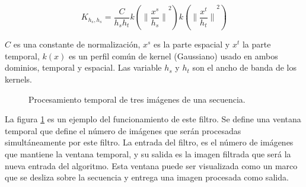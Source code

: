 \begin{equation} \label{eq:sagmm_filter}
K_{h_s,h_s} = \frac{C}{h_s h_t} k \left( {\| \frac{x^s}{h_s} \|}^2 \right) k \left( {\| \frac{x^t}{h_t} \|}^2 \right)
\end{equation}

$C$ es una constante de normalización, $x^s$ es la parte espacial y $x^t$ la parte temporal, $k(x)$ es un perfil común de kernel (Gaussiano) usado en ambos dominios, temporal y espacial. Las variable $h_s$ y $h_t$ son el ancho de banda de los kernels. 


\begin{figure}[h!]
\centering
{}
\caption[Procesamiento temporal de tres imágenes]{Procesamiento temporal de tres imágenes de una secuencia.}
\label{fig:spatio_temporal_filter_example}
\end{figure}


La figura \ref{fig:spatio_temporal_filter_example} es un ejemplo del funcionamiento de este filtro. Se define una ventana temporal que define el número de imágenes que serán procesadas simultáneamente por este filtro. La entrada del filtro, es el número de imágenes que mantiene la ventana temporal, y su salida es la imagen filtrada que será la nueva entrada del algoritmo. Esta ventana puede ser visualizada como un marco que se desliza sobre la secuencia y entrega una imagen procesada como salida.

